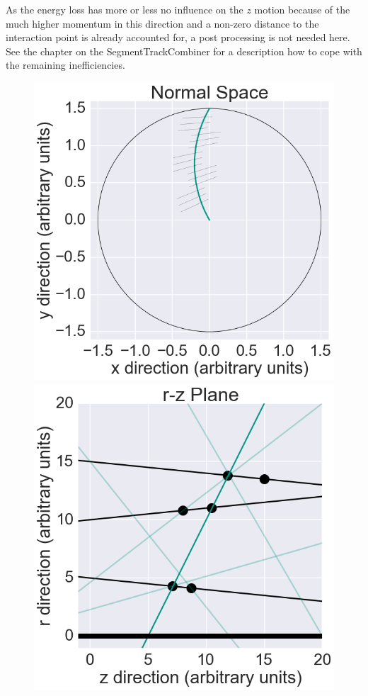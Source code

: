 As the energy loss has more or less no influence on the $z$ motion because of the much higher momentum in this direction and a non-zero distance to the interaction point is already accounted for, a post processing is not needed here. See the chapter on the SegmentTrackCombiner for a description how to cope with the remaining inefficiencies.


\begin{figure}
 \centering
 \includegraphics[scale=0.2]{figures/theory/stereo_1.png}
 \includegraphics[scale=0.2]{figures/theory/stereo_2.png}

\end{figure}
